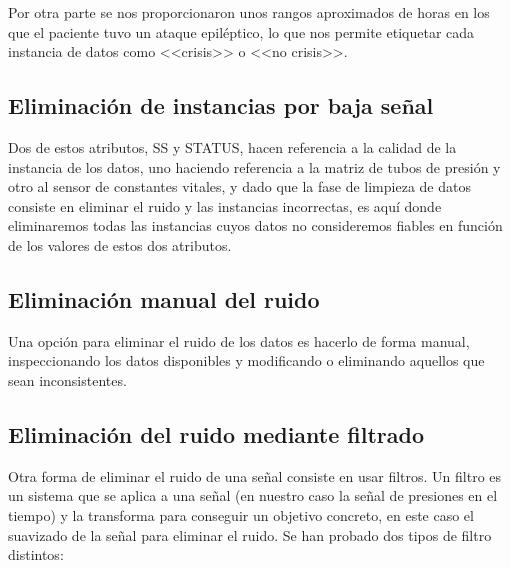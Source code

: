 Por otra parte se nos proporcionaron unos rangos aproximados de horas en los que el paciente tuvo un ataque epiléptico, lo que nos permite etiquetar cada instancia de datos como <<crisis>> o <<no crisis>>.  

\subsection{Eliminación de instancias por baja señal}

Dos de estos atributos, SS y STATUS, hacen referencia a la calidad de la instancia de los datos, uno haciendo referencia a la matriz de tubos de presión y otro al sensor de constantes vitales, y dado que la fase de limpieza de datos consiste en eliminar el ruido y las instancias incorrectas, es aquí donde eliminaremos todas las instancias cuyos datos no consideremos fiables en función de los valores de estos dos atributos. 

\subsection{Eliminación manual del ruido}

Una opción para eliminar el ruido de los datos es hacerlo de forma manual, inspeccionando los datos disponibles y modificando o eliminando aquellos que sean inconsistentes.  

\subsection{Eliminación del ruido mediante filtrado}

Otra forma de eliminar el ruido de una señal consiste en usar filtros. Un filtro es un sistema que se aplica a una señal (en nuestro caso la señal de presiones en el tiempo) y la transforma para conseguir un objetivo concreto, en este caso el suavizado de la señal para eliminar el ruido. Se han probado dos tipos de filtro distintos: 

